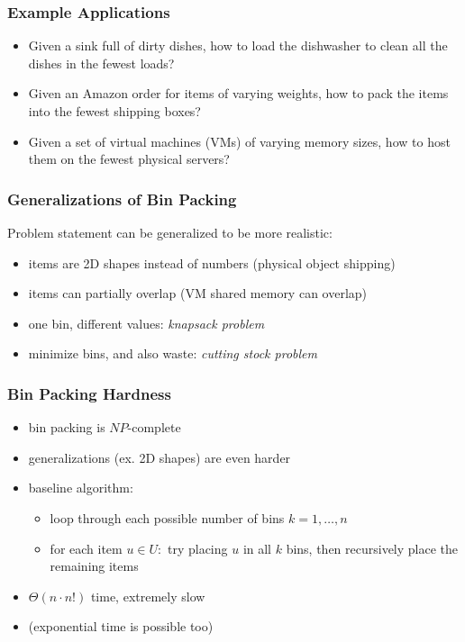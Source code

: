 \documentclass{beamer}
\begin{document}
\begin{frame} \frametitle{Example Applications}
  \begin{itemize}
    \item Given a sink full of dirty dishes, how to load the dishwasher to clean all the dishes in the fewest loads?
    \item Given an Amazon order for items of varying weights, how to pack the items into the fewest shipping boxes?
    \item Given a set of virtual machines (VMs) of varying memory sizes, how to host them on the fewest physical servers?
  \end{itemize}
\end{frame}

\begin{frame} \frametitle{Generalizations of Bin Packing}
  Problem statement can be generalized to be more realistic:
  \begin{itemize}
    \item items are 2D shapes instead of numbers (physical object shipping)
    \item items can partially overlap (VM shared memory can overlap)
    \item one bin, different values: \emph{knapsack problem}
    \item minimize bins, and also waste: \emph{cutting stock problem}
  \end{itemize}
\end{frame}

\begin{frame} \frametitle{Bin Packing Hardness}
  \begin{itemize}
    \item bin packing is $NP$-complete
    \item generalizations (ex. 2D shapes) are even harder
    \item baseline algorithm:
      \begin{itemize}
        \item loop through each possible number of bins $k=1, \ldots, n$
        \item for each item $u \in U:$ try placing $u$ in all $k$ bins, then recursively place the remaining items
      \end{itemize}
    \item $\Theta(n \cdot n!)$ time, extremely slow
    \item (exponential time is possible too)
  \end{itemize}
\end{frame}
\end{document}
